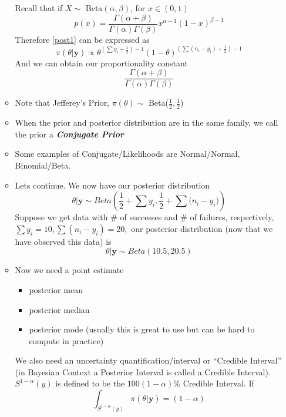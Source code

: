 \documentclass[]{article}
\begin{document}
\begin{itemize}
\begin{itemize}
	Recall that if $X\sim$ Beta$(\alpha,\beta)$, for $x\in(0,1)$
	\begin{equation*}
	p(x) = \frac{\Gamma(\alpha+\beta)}{\Gamma(\alpha)\Gamma(\beta)}x^{\alpha-1}(1-x)^{\beta-1}
	\end{equation*}
	Therefore \ref{post1} can be expressed as
	\begin{equation}
	\pi(\theta|\textbf{y})\propto \theta^{(\sum{y_i}+\frac{1}{2})-1}(1-\theta)^{(\sum{(n_i-y_i)}+\frac{1}{2})-1}
	\end{equation}
	And we can obtain our proportionality constant
	\begin{equation*}
	\frac{\Gamma(\alpha+\beta)}{\Gamma(\alpha)\Gamma(\beta)}
	\end{equation*}
	\item Note that Jefferey's Prior, $\pi(\theta)\sim$ Beta($\frac{1}{2},\frac{1}{2}$)
	
	\item When the prior and posterior distribution are in the same family, we call the prior a \textit{\textbf{Conjugate Prior}}
	\item Some examples of Conjugate/Likelihoods are Normal/Normal, Binomial/Beta.	
	\item Lets continue. We now have our posterior distribution
	\begin{equation*}
	\theta|\textbf{y}\sim Beta\left(\frac{1}{2}+\sum{y_i}, \frac{1}{2}+\sum{(n_i-y_i})\right)
	\end{equation*}
	Suppose we get data with $\#$ of successes and $\#$ of failures, respectively, $\sum{y_i} = 10, \sum{(n_i-y_i)} = 20,$
	our posterior distribution (now that we have observed this data) is 
	\begin{equation*}
		\theta|\textbf{y}\sim Beta(10.5,20.5)
	\end{equation*}
	\item Now we need a point estimate
		\begin{itemize}
			\item posterior mean
			\item posterior median
			\item posterior mode (usually this is great to use but can be hard to compute in practice)
		\end{itemize}
		We also need an uncertainty quantification/interval or "`Credible Interval"' (in Bayesian Context a Posterior Interval is called a Credible Interval). \linebreak\linebreak
			$S^{1-\alpha}(y)$ is defined to be the $100(1-\alpha)\%$ Credible Interval. If
		\begin{equation}
		\int_{S^{1-\alpha}(y)}{\pi(\theta|\textbf{y})} = (1-\alpha)
		\label{eq:}
		\end{equation}
	\end{itemize}
	\end{itemize}
\end{document}
